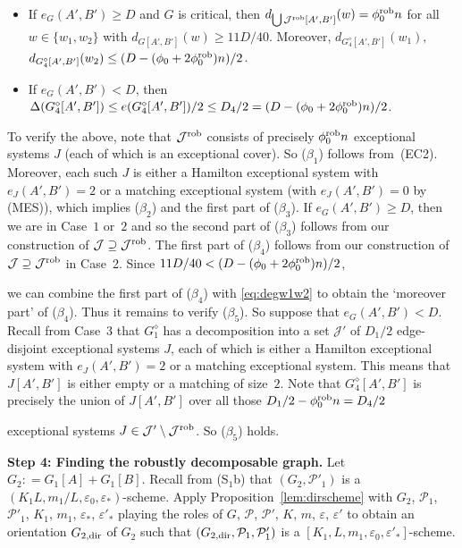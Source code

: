 \documentclass{memo-l}
\def\COMMENT#1{}
\def\cP{\mathcal{P}}
\def\eps{\varepsilon}
\def\cJ{\mathcal{J}}
\def\epszero{\eps_0}
\numberwithin{section}{chapter}
\numberwithin{equation}{section}
\numberwithin{firstthm}{section}
\numberwithin{figure}{section}
\begin{document}
{\begin{itemize}
If $e_G(A',B') \ge D$, then $\mathcal{J}^{\rm rob}$ consists entirely of Hamilton exceptional systems.
 If $\mathcal{J}^{\rm rob}$ contains a matching exceptional system, then $|A'|=|B'|=n/2$ is even.
	\item[($\beta_4$)] If $e_G(A',B') \ge D$ and $G$ is critical, then $d_{\bigcup\mathcal{J}^{\rm rob}[A',B'] }(w) =\phi^{\rm rob}_0 n $ for
all $w \in \{w_1,w_2\}$ with $d_{G[A',B']}(w) \ge 11D/40$.
	Moreover, $d_{G^{\diamond}_4[A',B']}(w_1),$ $ d_{G^{\diamond}_4[A',B']}(w_2) \le  (D - (\phi_0  + 2 \phi^{\rm rob}_0)n)/2$.	
	\item[($\beta_5$)] If $e_G(A',B') < D$, then $\Delta( G^{\diamond}_4 [A',B']) \le e(G^{\diamond}_4  [A',B'])/2  \le  D_4/2 = (D - (\phi_0  + 2 \phi^{\rm rob}_0)n)/2$.
\end{itemize}
To verify the above, note that $ \mathcal{J}^{\rm rob}$ consists of precisely $\phi^{\rm rob}_0 n$ exceptional systems $J$ (each of which is an exceptional cover).
So ($\beta_1$) follows from~(EC2). Moreover, each such $J$ is either a Hamilton exceptional system with $e_{J}(A',B') = 2$ or a matching exceptional system
(with $e_{J}(A',B') = 0$ by (MES)), which implies ($\beta_2$) and the first part of ($\beta_3$).
If $e_G(A',B') \ge D$, then we are in Case~$1$ or~$2$ and so the second part of ($\beta_3$) follows from our construction of $\cJ\supseteq \mathcal{J}^{\rm rob}$.
The first part of ($\beta_4$) follows from our construction
of $\cJ\supseteq \mathcal{J}^{\rm rob}$ in Case~2. Since $11D/40 < (D - (\phi_0  + 2 \phi^{\rm rob}_0)n)/2$,%
\COMMENT{Daniela: reworded, previously we said that we need $11D/40 < (D - (\phi_0  + 2 \phi^{\rm rob}_0)n)/2$ to prove
the first part of ($\beta_4$)}
we can combine the first part of ($\beta_4$) with \eqref{eq:degw1w2} to obtain the `moreover part' of ($\beta_4$).
Thus it remains to verify ($\beta_5$). So suppose that $e_G(A',B') < D$.
Recall from Case~3 that $G^{\diamond}_1$ has a decomposition into a set $\cJ'$ of $D_1/2$ edge-disjoint exceptional systems $J$,
each of which is either a Hamilton exceptional system with $e_{J}(A',B') = 2$ or a matching exceptional system.
This means that $J[A',B']$ is either empty or a matching of size~$2$.
Note that $G^{\diamond}_4 [A',B']$ is precisely the union of $J[A',B']$ over all those $D_1/2 - \phi^{\rm rob}_0 n=D_4/2$%
   \COMMENT{Daniela: added $=D_4/2$}
exceptional systems $J\in \cJ'\setminus \mathcal{J}^{\rm rob}$. So ($\beta_5$) holds.

\smallskip

\noindent\textbf{Step 4: Finding the robustly decomposable graph.}
Let $G_2 : = G_1[A] + G_1[B]$.
Recall from (S$_1$b) that $(G_2,\cP'_1)$ is a $(K_1L, m_1/L, \epszero,\eps_*)$-scheme.
Apply Proposition~\ref{lem:dirscheme} with $G_2$, $\cP_1$, $\cP'_1$, $K_1$, $m_1$, $\eps_*$, $\eps'_*$ playing the roles of
$G$, $\cP$, $\cP'$, $K$, $m$, $\eps$, $\eps'$ to obtain an orientation $G_{2,{\rm dir}}$ of $G_2$ such that
$(G_{2,{\rm dir}}, \mathcal{P}_1,\cP'_1)$ is a $[K_1, L, m_1, \epszero,\eps'_*]$-scheme. 

}
\end{document}
